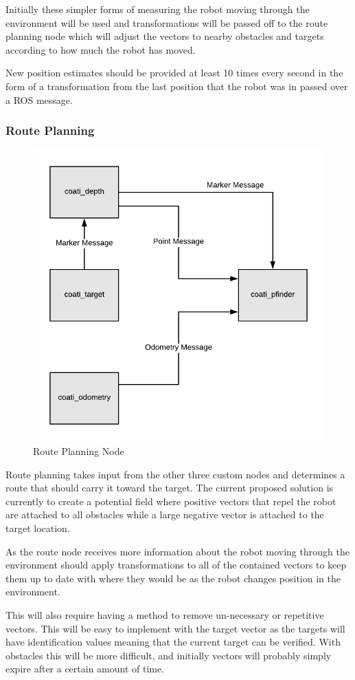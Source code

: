 \documentclass{article}
\begin{document}
	Initially these simpler forms of measuring the robot moving through the environment will be used and transformations will be passed off to the route planning node which will adjust the vectors to nearby obstacles and targets according to how much the robot has moved. 
	
	New position estimates should be provided at least 10 times every second in the form of a transformation from the last position that the robot was in passed over a ROS message.

	\subsubsection{Route Planning}
	
	\begin{figure}[H]
		\centering
		\includegraphics[width=0.6\linewidth]{PathFinderDiagram.png}
		\caption{Route Planning Node}
		\label{fig:routeplanning}
	\end{figure}

	Route planning takes input from the other three custom nodes and determines a route that should carry it toward the target. The current proposed solution is currently to create a potential field where positive vectors that repel the robot are attached to all obstacles while a large negative vector is attached to the target location.
	
	As the route node receives more information about the robot moving through the environment should apply transformations to all of the contained vectors to keep them up to date with where they would be as the robot changes position in the environment. 
	
	This will also require having a method to remove un-necessary or repetitive vectors. This will be easy to implement with the target vector as the targets will have identification values meaning that the current target can be verified. With obstacles this will be more difficult, and initially vectors will probably simply expire after a certain amount of time. 
	
\end{document}
